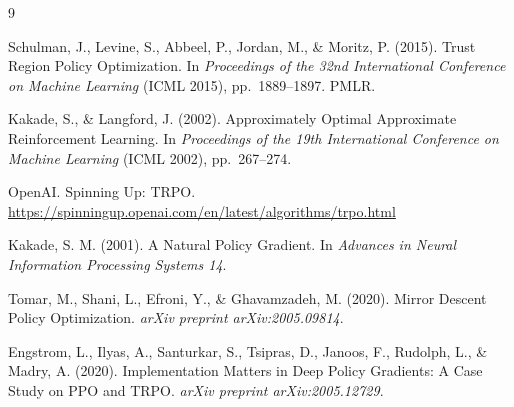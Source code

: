 \documentclass[12pt]{article}
\begin{document}
\begin{thebibliography}{9}

Schulman, J., Levine, S., Abbeel, P., Jordan, M., \& Moritz, P. (2015).
Trust Region Policy Optimization.
In \textit{Proceedings of the 32nd International Conference on Machine Learning}
(ICML 2015), pp.\ 1889--1897. PMLR.

Kakade, S., \& Langford, J. (2002).
Approximately Optimal Approximate Reinforcement Learning.
In \textit{Proceedings of the 19th International Conference on Machine Learning}
(ICML 2002), pp.\ 267--274.

OpenAI. Spinning Up: TRPO.
\url{https://spinningup.openai.com/en/latest/algorithms/trpo.html}

Kakade, S. M. (2001).
A Natural Policy Gradient.
In \textit{Advances in Neural Information Processing Systems 14}.

Tomar, M., Shani, L., Efroni, Y., \& Ghavamzadeh, M. (2020).
Mirror Descent Policy Optimization.
\textit{arXiv preprint arXiv:2005.09814}.

Engstrom, L., Ilyas, A., Santurkar, S., Tsipras, D., Janoos, F.,
Rudolph, L., \& Madry, A. (2020).
Implementation Matters in Deep Policy Gradients: A Case Study on PPO and TRPO.
\textit{arXiv preprint arXiv:2005.12729}.

\end{thebibliography}
\end{document}
